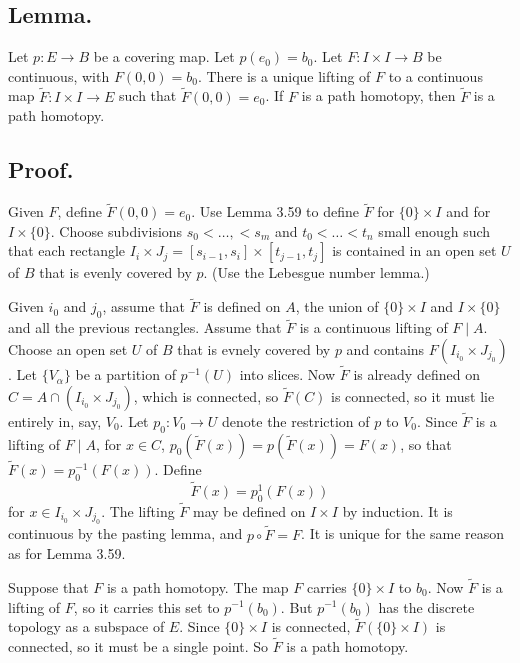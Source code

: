 \documentclass[titlepage]{article}
\begin{document}
\subsection{Lemma.} Let $p: E \to B$ be a covering map. Let $p(e_{0}) = b_{0}$. Let $F: I \times I \to B$ be continuous, with $F(0, 0) = b_{0}$. There is a unique lifting of $F$ to a continuous map $\tilde{F}: I \times I \to E$ such that $\tilde{F}(0, 0) = e_{0}$. If $F$ is a path homotopy, then $\tilde{F}$ is a path homotopy.

\subsection{Proof.} Given $F$, define $\tilde{F}(0, 0) = e_{0}$. Use Lemma 3.59 to define $\tilde{F}$ for $\{0\} \times I$ and for $I \times \{0\}$. Choose subdivisions $s_{0} < \ldots, < s_{m}$ and $t_{0} < \ldots < t_{n}$ small enough such that each rectangle $I_{i} \times J_{j} = [s_{i-1}, s_{i}] \times [t_{j-1}, t_{j}]$ is contained in an open set $U$ of $B$ that is evenly covered by $p$. (Use the Lebesgue number lemma.)

Given $i_{0}$ and $j_{0}$, assume that $\tilde{F}$ is defined on $A$, the union of $\{0\} \times I$ and $I \times \{0\}$ and all the previous rectangles. Assume that $\tilde{F}$ is a continuous lifting of $F \mid A$. Choose an open set $U$ of $B$ that is evnely covered by $p$ and contains $F(I_{i_{0}} \times J_{j_{0}})$. Let $\{V_{\alpha}\}$ be a partition of $p^{-1}(U)$ into slices. Now $\tilde{F}$ is already defined on $C = A \cap (I_{i_{0}} \times J_{j_{0}})$, which is connected, so $\tilde{F}(C)$ is connected, so it must lie entirely in, say, $V_{0}$. Let $p_{0}: V_{0} \to U$ denote the restriction of $p$ to $V_{0}$. Since $\tilde{F}$ is a lifting of $F \mid A$, for $x \in C$, $p_{0}(\tilde{F}(x)) = p(\tilde{F}(x)) = F(x)$, so that $\tilde{F}(x) = p_{0}^{-1}(F(x))$. Define 
$$\tilde{F}(x) = p_{0}^{1}(F(x))$$
for $x \in I_{i_{0}} \times J_{j_{0}}$. The lifting $\tilde{F}$ may be defined on $I \times I$ by induction. It is continuous by the pasting lemma, and $p \circ \tilde{F} = F$. It is unique for the same reason as for Lemma 3.59.

Suppose that $F$ is a path homotopy. The map $F$ carries $\{0\} \times I$ to $b_{0}$. Now $\tilde{F}$ is a lifting of $F$, so it carries this set to $p^{-1}(b_{0})$. But $p^{-1}(b_{0})$ has the discrete topology as a subspace of $E$. Since $\{0\} \times I$ is connected, $\tilde{F}(\{0\} \times I)$ is connected, so it must be a single point. So $\tilde{F}$ is a path homotopy.
\end{document}
